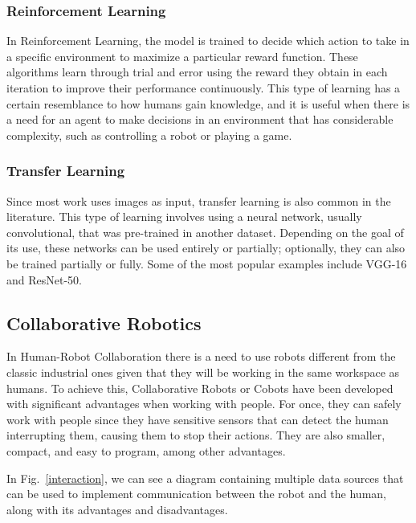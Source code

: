 \subsubsection{Reinforcement Learning}

In Reinforcement Learning, the model is trained to decide which action to take in a specific environment to maximize a particular reward function. These algorithms learn through trial and error using the reward they obtain in each iteration to improve their performance continuously. This type of learning has a certain resemblance to how humans gain knowledge, and it is useful when there is a need for an agent to make decisions in an environment that has considerable complexity, such as controlling a robot or playing a game.

\subsubsection{Transfer Learning}

Since most work uses images as input, transfer learning is also common in the literature. This type of learning involves using a neural network, usually convolutional, that was pre-trained in another dataset. Depending on the goal of its use, these networks can be used entirely or partially; optionally, they can also be trained partially or fully. Some of the most popular examples include VGG-16 and ResNet-50.

\subsection{Collaborative Robotics}

In Human-Robot Collaboration there is a need to use robots different from the classic industrial ones given that they will be working in the same workspace as humans. To achieve this, Collaborative Robots or Cobots have been developed with significant advantages when working with people. For once, they can safely work with people since they have sensitive sensors that can detect the human interrupting them, causing them to stop their actions. They are also smaller, compact, and easy to program, among other advantages. \cite{CobotsWW}

In Fig.~\ref{interaction}, we can see a diagram containing multiple data sources that can be used to implement communication between the robot and the human, along with its advantages and disadvantages.

